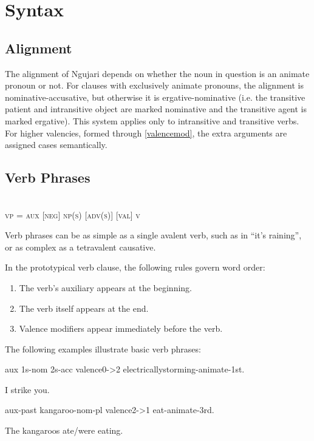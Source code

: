 \chapter{Syntax}

\section{Alignment}

The alignment of Ngujari depends on whether the noun in question is an animate
pronoun or not. For clauses with exclusively animate pronouns, the alignment is
nominative-accusative, but otherwise it is ergative-nominative (i.e. the
transitive patient and intransitive object are marked nominative and the
transitive agent is marked ergative). This system applies only to intransitive
and transitive verbs. For higher valencies, formed through \ref{valencemod}, the
extra arguments are assigned cases semantically.

\section{Verb Phrases}

\begin{definition}
~\\
\textsc{vp = aux [neg] np(s) [adv(s)] [val] v}
\end{definition}

Verb phrases can be as simple as a single avalent verb, such as in ``it's raining'', or as complex as a tetravalent causative.

In the prototypical verb clause, the following rules govern word order:

\begin{enumerate}
\item The verb's auxiliary appears at the beginning.
\item The verb itself appears at the end.
\item Valence modifiers appear immediately before the verb.
\end{enumerate}

The following examples illustrate basic verb phrases:

aux 1s-nom 2s-acc valence0->2 electricallystorming-animate-1st.

I strike you.

aux-past kangaroo-nom-pl valence2->1 eat-animate-3rd.

The kangaroos ate/were eating.

